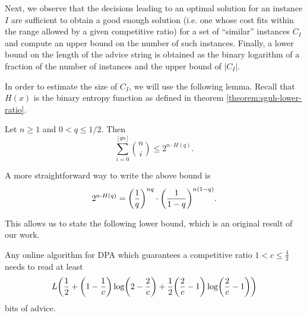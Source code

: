 Next, we observe that the decisions leading to an optimal solution for an
instance $I$ are sufficient to obtain a good enough solution (i.e. one
whose cost fits within the range allowed by a given competitive ratio) for
a set of ``similar'' instances $C_I$ and compute an upper bound on the
number of such instances. Finally, a lower bound on the length of the
advice string is obtained as the binary logarithm of a fraction of the
number of instances and the upper bound of $|C_I|$.

In order to estimate the size of $C_I$, we will use the following lemma.
Recall that $H(x)$ is the binary entropy function as defined in theorem
\ref{theorem:sguh-lower-ratio}.

\begin{lemma}\label{lemma:hamming}
    Let $n \geq 1$ and $0 < q \leq 1/2$. Then
    $$
        \sum_{i=0}^{\lfloor{}qn\rfloor} \binom{n}{i} \leq
        2^{n\cdot{}H(q)}.
    $$
\end{lemma}

A more straightforward way to write the above bound is
$$
    2^{n\cdot{}H(q)} = \paren*{\frac{1}{q}}^{nq} \cdot
    \paren*{\frac{1}{1-q}}^{n(1-q)}.
$$

This allows us to state the following lower bound, which is an original
result of our work.

\begin{theorem}\label{theorem:dpa-lower-bound-half}
    Any online algorithm for DPA which guarantees a competitive ratio $1 <
    c \leq \frac{4}{3}$ needs to read at least
    $$
        L \paren*{\frac{1}{2} +
        \paren*{1-\frac{1}{c}}\log\paren*{2-\frac{2}{c}} +
        \frac{1}{2}\paren*{\frac{2}{c}-1}\log\paren*{\frac{2}{c}-1}}
    $$
    bits of advice.
\end{theorem}


